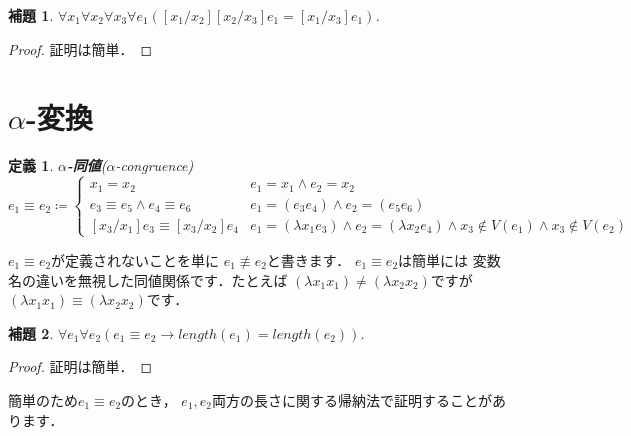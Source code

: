 \documentclass{ltjsbook}%
\newtheorem{lemma}{補題}[section]%
\newtheorem{definition}{定義}[section]%
\newcommand\term[2]{\textbf{#1}{(\textit{#2})}}%
\begin{document}
\begin{lemma}%
  \label{lemma:subst_trans}%
  $\forall\mathit{x}_1\forall\mathit{x}_2\forall\mathit{x}_3\forall\mathit{e}_1%
  ([\mathit{x}_1/\mathit{x}_2][\mathit{x}_2/\mathit{x}_3]\mathit{e}_1%
  =[\mathit{x}_1/\mathit{x}_3]\mathit{e}_1)$.%
\end{lemma}%
\begin{proof}%
  証明は簡単．%
\end{proof}%
\section{$\alpha$-変換}%
\label{sect:alpha}%
\begin{definition}%
\term{$\alpha$-同値}{$\alpha$-congruence}%
\begin{equation}%
  \mathit{e}_1\equiv\mathit{e}_2 \coloneqq \begin{cases}%
    \mathit{x}_1 = \mathit{x}_2%
    & \mathit{e}_1 = \mathit{x}_1%
    \land \mathit{e}_2 = \mathit{x}_2\\%
    \mathit{e}_3\equiv\mathit{e}_5\land\mathit{e}_4\equiv\mathit{e}_6%
    & \mathit{e}_1 = (\mathit{e}_3\mathit{e}_4)%
    \land \mathit{e}_2 = (\mathit{e}_5\mathit{e}_6)\\%
    {}[\mathit{x}_3/\mathit{x}_1]\mathit{e}_3%
    \equiv{}[\mathit{x}_3/\mathit{x}_2]\mathit{e}_4%
    & \mathit{e}_1 = (\lambda\mathit{x}_1\mathit{e}_3)%
    \land \mathit{e}_2 = (\lambda\mathit{x}_2\mathit{e}_4)%
    \land \mathit{x}_3\not\in V(\mathit{e}_1)%
    \land \mathit{x}_3\not\in V(\mathit{e}_2)%
  \end{cases}%
\end{equation}%
\end{definition}%
\par$\mathit{e}_1\equiv\mathit{e}_2$が定義されないことを単に%
$\mathit{e}_1\not\equiv\mathit{e}_2$と書きます．%
$\mathit{e}_1\equiv\mathit{e}_2$は簡単には%
変数名の違いを無視した同値関係です．たとえば%
$(\lambda x_1x_1)\neq(\lambda x_2x_2)$ですが%
$(\lambda x_1x_1)\equiv(\lambda x_2x_2)$です．%
\begin{lemma}%
  \label{lemma:alpha_len}%
  $\forall\mathit{e}_1\forall\mathit{e}_2%
  (\mathit{e}_1\equiv\mathit{e}_2\rightarrow%
  length(\mathit{e}_1)=length(\mathit{e}_2))$.%
\end{lemma}%
\begin{proof}%
  証明は簡単．%
\end{proof}%
簡単のため$\mathit{e}_1\equiv\mathit{e}_2$のとき，%
$\mathit{e}_1,\mathit{e}_2$両方の長さに関する帰納法で証明することがあります．%
\end{document}
